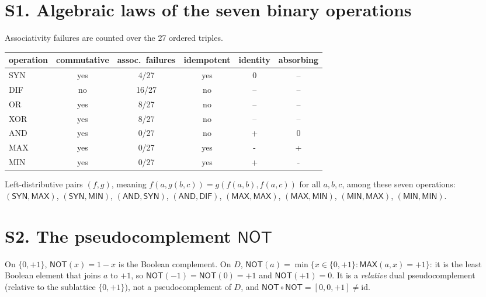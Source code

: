 \documentclass[10pt,a4paper]{article}
\newcommand{\D}{D}\newcommand{\Z}{\mathcal Z}\newcommand{\SYN}{\mathsf{SYN}}\newcommand{\DIF}{\mathsf{DIF}}\newcommand{\OR}{\mathsf{OR}}\newcommand{\XOR}{\mathsf{XOR}}\newcommand{\AND}{\mathsf{AND}}\newcommand{\NOT}{\mathsf{NOT}}\newcommand{\ANT}{\mathsf{ANT}}\newcommand{\MAX}{\mathsf{MAX}}\newcommand{\MIN}{\mathsf{MIN}}\newcommand{\MAG}{\mathsf{MAG}}\newcommand{\chai}{Chai}\newcommand{\Fone}{\mathcal F_1}\newcommand{\Ftwo}{\mathcal F_2}\usepackage{tikz}\usetikzlibrary{arrows.meta,positioning}\newcommand{\yang}{\rule{0.8em}{0.18ex}}\newcommand{\yin}{\rule{0.25em}{0.18ex}\hspace{0.3em}\rule{0.25em}{0.18ex}}\newcommand{\tri}[3]{\raisebox{-0.01ex}{\shortstack[c]{#1\\[-0.3ex]#2\\[-0.3ex]#3}}}\newcommand{\iv}[1]{[\![#1]\!]}
\begin{document}
\section*{S1. Algebraic laws of the seven binary operations}
Associativity failures are counted over the 27 ordered triples.
\begin{center}\small\begin{tabular}{lccccc}\toprule
operation & commutative & assoc.\ failures & idempotent & identity & absorbing\\\midrule
\textsf{SYN}&yes&4/27&yes&0&--\\
\textsf{DIF}&no&16/27&no&--&--\\
\textsf{OR}&yes&8/27&no&--&--\\
\textsf{XOR}&yes&8/27&no&--&--\\
\textsf{AND}&yes&0/27&no&+&0\\
\textsf{MAX}&yes&0/27&yes&-&+\\
\textsf{MIN}&yes&0/27&yes&+&-\\
\bottomrule\end{tabular}\end{center}
Left-distributive pairs $(f,g)$, meaning $f(a,g(b,c))=g(f(a,b),f(a,c))$ for all $a,b,c$, among these seven operations: $(\mathsf{SYN},\mathsf{MAX})$, $(\mathsf{SYN},\mathsf{MIN})$, $(\mathsf{AND},\mathsf{SYN})$, $(\mathsf{AND},\mathsf{DIF})$, $(\mathsf{MAX},\mathsf{MAX})$, $(\mathsf{MAX},\mathsf{MIN})$, $(\mathsf{MIN},\mathsf{MAX})$, $(\mathsf{MIN},\mathsf{MIN})$.

\section*{S2. The pseudocomplement $\NOT$}
On $\{0,+1\}$, $\NOT(x)=1-x$ is the Boolean complement. On $\D$, $\NOT(a)=\min\{x\in\{0,+1\}:\MAX(a,x)=+1\}$: it is the least Boolean element that joins $a$ to $+1$, so $\NOT(-1)=\NOT(0)=+1$ and $\NOT(+1)=0$. It is a \emph{relative} dual pseudocomplement (relative to the sublattice $\{0,+1\}$), not a pseudocomplement of $\D$, and $\NOT\circ\NOT=[0,0,+1]\neq\mathrm{id}$.
\end{document}
